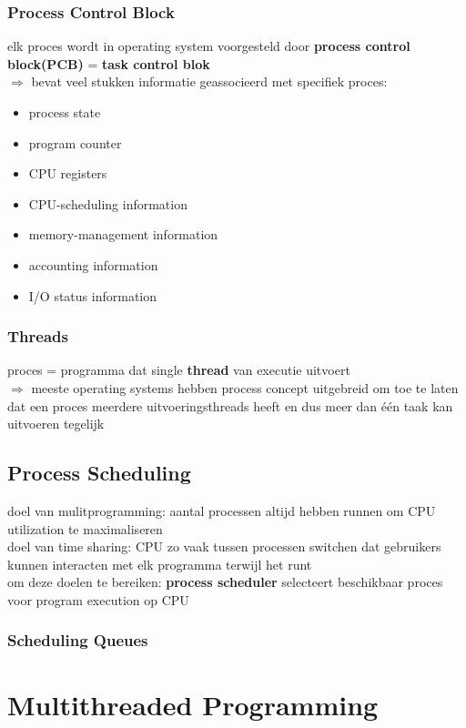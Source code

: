 \documentclass{report}
\begin{document}
\subsection{Process Control Block}
elk proces wordt in operating system voorgesteld door \textbf{process control block(PCB)} = \textbf{task control blok}
\\$\Rightarrow$ bevat veel stukken informatie geassocieerd met specifiek proces:
\begin{itemize}
\item process state
\item program counter
\item CPU registers
\item CPU-scheduling information
\item memory-management information
\item accounting information
\item I/O status information
\end{itemize}

\subsection{Threads}
proces = programma dat single \textbf{thread} van executie uitvoert
\\$\Rightarrow$ meeste operating systems hebben process concept uitgebreid om toe te laten dat een proces meerdere uitvoeringsthreads heeft en dus meer dan \'e\'en taak kan uitvoeren tegelijk

\section{Process Scheduling}
doel van mulitprogramming: aantal processen altijd hebben runnen om CPU utilization te maximaliseren
\\doel van time sharing: CPU zo vaak tussen processen switchen dat gebruikers kunnen interacten met elk programma terwijl het runt
\\om deze doelen te bereiken: \textbf{process scheduler} selecteert beschikbaar proces voor program execution op CPU

\subsection{Scheduling Queues}
\chapter{Multithreaded Programming}
\end{document}

